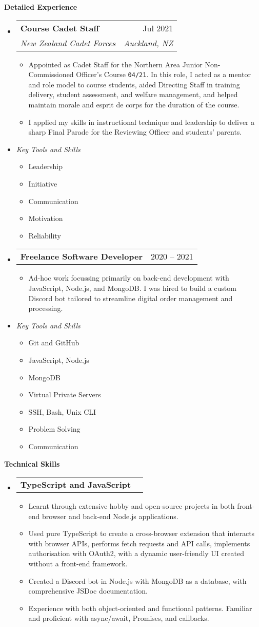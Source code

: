 \documentclass[11pt,a4paper]{article}[leftmargin=*]
\makeatletter
\def \entryspacing {-0pt}
\renewcommand{\section}[2]{\vspace{5pt}
  \colorbox{secondary}{\color{white}\raggedbottom\normalsize\textbf{{#1}{\hspace{7pt}#2}}}
}
\newcommand{\resumeEntryStart}{\begin{itemize}[leftmargin=2.5mm]}
\newcommand{\resumeEntryEnd}{\end{itemize}\vspace{\entryspacing}}
\newcommand{\resumeItemListStart}{\begin{itemize}[leftmargin=4.5mm]}
\newcommand{\resumeItemListEnd}{\end{itemize}}
\newcommand{\resumeItem}[1]{
  \item\small{
    {#1 \vspace{-2pt}}
  }
}
\newcommand{\resumeEntryTSDL}[4]{
  \vspace{-1pt}\item[]
    \begin{tabularx}{0.97\textwidth}{X@{\hspace{60pt}}r}
      \textbf{\color{primary}#1} & {\firabook\color{accent}\small#2} \\
      \textit{\color{accent}\small#3} & \textit{\color{accent}\small#4} \\
    \end{tabularx}\vspace{-6pt}
}
\newcommand{\resumeEntryTD}[2]{
  \vspace{-1pt}\item[]
    \begin{tabularx}{0.97\textwidth}{X@{\hspace{60pt}}r}
      \textbf{\color{primary}#1} & {\firabook\color{accent}\small#2} \\
    \end{tabularx}\vspace{-6pt}
}
\newcommand{\resumeEntryE}[1]{
  \item[]\small{
    \textit{\color{accent}\small#1 \vspace{-6pt}}
  }\\
}
\makeatother
\begin{document}

\section{\faBriefcase}{Detailed Experience}

\resumeEntryStart
\resumeEntryTSDL
{Course Cadet Staff}{Jul 2021}
{New Zealand Cadet Forces}{Auckland, NZ}
\resumeItemListStart
\resumeItem {Appointed as Cadet Staff for the Northern Area Junior Non-Commissioned Officer’s Course \texttt{04/21}. In this role, I acted as a mentor and role model to course students, aided Directing Staff in training delivery, student assessment, and welfare management, and helped maintain morale and esprit de corps for the duration of the course.}
\resumeItem {I applied my skills in instructional technique and leadership to deliver a sharp Final Parade for the Reviewing Officer and students’ parents.}
\resumeItemListEnd
\resumeEntryE{Key Tools and Skills}
\resumeItemListStart
\resumeItem {Leadership}
\resumeItem {Initiative}
\resumeItem {Communication}
\resumeItem {Motivation}
\resumeItem {Reliability}
\resumeItemListEnd
\resumeEntryEnd

\resumeEntryStart
\resumeEntryTD
{Freelance Software Developer}{2020 -- 2021}
\resumeItemListStart
\resumeItem {Ad-hoc work focussing primarily on back-end development with JavaScript, Node.js, and MongoDB. I was hired to build a custom Discord bot tailored to streamline digital order management and processing.}
\resumeItemListEnd
\resumeEntryE{Key Tools and Skills}
\resumeItemListStart
\resumeItem {Git and GitHub}
\resumeItem {JavaScript, Node.js}
\resumeItem {MongoDB}
\resumeItem {Virtual Private Servers}
\resumeItem {SSH, Bash, Unix CLI}
\resumeItem {Problem Solving}
\resumeItem {Communication}
\resumeItemListEnd
\resumeEntryEnd


\section{\faCogs}{Technical Skills}

\resumeEntryStart
\resumeEntryTD
{TypeScript and JavaScript}{}
\resumeItemListStart
\resumeItem {Learnt through extensive hobby and open-source projects in both front-end browser and back-end Node.js applications.}
\resumeItem {Used pure TypeScript to create a cross-browser extension that interacts with browser APIs, performs fetch requests and API calls, implements authorisation with OAuth2, with a dynamic user-friendly UI created without a front-end framework.}
\resumeItem {Created a Discord bot in Node.js with MongoDB as a database, with comprehensive JSDoc documentation.}
\resumeItem {Experience with both object-oriented and functional patterns. Familiar and proficient with async/await, Promises, and callbacks.}
\resumeItemListEnd
\resumeEntryEnd
\end{document}
